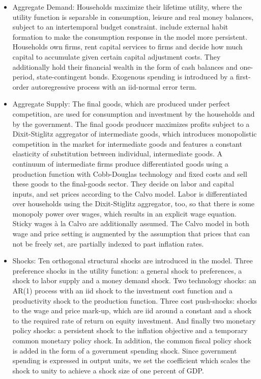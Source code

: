 \documentclass[11pt,a4paper]{article}
\begin{document}
	\begin{itemize}
		\item Aggregate Demand: Households maximize their lifetime utility, where the utility function is separable in consumption, leisure and real money balances, subject to an intertemporal budget constraint. \cite{SmetsWouters2003} include external habit formation to make the consumption response in the model more persistent. Households own firms, rent capital services to firms and decide how much capital to accumulate given certain capital adjustment costs. They additionally hold their financial wealth in the form of cash balances and one-period, state-contingent bonds. Exogenous spending is introduced by a first-order autoregressive process with an iid-normal error term.
		\item Aggregate Supply: The final goods, which are produced under perfect competition, are used for consumption and investment by the households and by the government. The final goods producer maximizes profits subject to a Dixit-Stiglitz aggregator of intermediate goods, which introduces monopolistic competition in the market for intermediate goods and features a constant elasticity of substitution between individual, intermediate goods. A continuum of intermediate firms produce differentiated goods using a production function with Cobb-Douglas technology and fixed costs and sell these goods to the final-goods sector. They decide on labor and capital inputs, and set prices according to the Calvo model. Labor is differentiated over households using the Dixit-Stiglitz aggregator, too, so that there is some monopoly power over wages, which results in an explicit wage equation. Sticky wages \`{a} la Calvo are additionally assumed. The Calvo model in both wage and price setting is augmented by the assumption that prices that can not be freely set, are partially indexed to past inflation rates.
		\item Shocks: Ten orthogonal structural shocks are introduced in the model. Three preference shocks in the utility function: a general shock to preferences, a shock to labor supply and a money demand shock. Two technology shocks: an AR(1) process with an iid shock to the investment cost function and a productivity shock to the production function. Three cost push-shocks: shocks to the wage and price mark-up, which are iid around a constant and a shock to the required rate of return on equity investment. And finally two monetary policy shocks: a persistent shock to the inflation objective and a temporary common monetary policy shock. In addition, the common fiscal policy shock is added in the form of a government spending shock. Since government spending is expressed in output units, we set the coefficient which scales the shock to unity to achieve a shock size of one percent of GDP.

\end{itemize}
\end{document}

